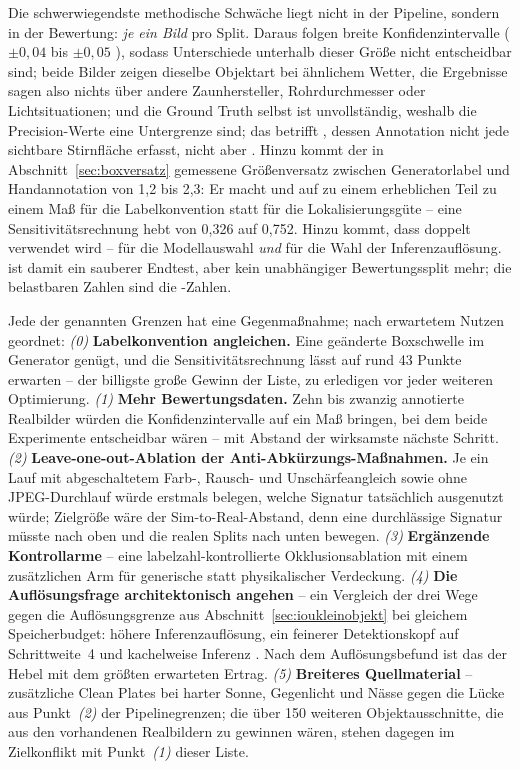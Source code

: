 Die schwerwiegendste methodische Schwäche liegt
nicht in der Pipeline, sondern in der Bewertung: \emph{je ein Bild} pro Split.
Daraus folgen breite Konfidenzintervalle ($\pm 0{,}04$ bis $\pm 0{,}05$
\mAPfifty{}), sodass Unterschiede unterhalb dieser Größe nicht entscheidbar sind;
beide Bilder zeigen dieselbe Objektart bei ähnlichem Wetter, die Ergebnisse sagen
also nichts über andere Zaunhersteller, Rohrdurchmesser oder Lichtsituationen;
und die Ground Truth selbst ist unvollständig, weshalb die Precision-Werte eine
Untergrenze sind; das betrifft , dessen Annotation nicht jede
sichtbare Stirnfläche erfasst, nicht aber . Hinzu kommt der in
Abschnitt~\ref{sec:boxversatz}
gemessene Größenversatz zwischen Generatorlabel und Handannotation von 1,2 bis
2,3\px:
Er macht \mAPseven{} und \mAPall{} auf  zu einem erheblichen Teil zu
einem Maß für die Labelkonvention statt für die Lokalisierungsgüte -- eine
Sensitivitätsrechnung hebt \mAPseven{} von 0,326 auf 0,752. Hinzu kommt, dass  doppelt verwendet wird -- für die
Modellauswahl \emph{und} für die Wahl der Inferenzauflösung.  ist
damit ein sauberer Endtest,  aber kein unabhängiger Bewertungssplit
mehr; die belastbaren Zahlen sind die -Zahlen.

 Jede der genannten Grenzen hat eine Gegenmaßnahme;
nach erwartetem Nutzen geordnet: \emph{(0)} \textbf{Labelkonvention angleichen.}
Eine geänderte Boxschwelle im Generator genügt, und die Sensitivitätsrechnung
lässt auf  rund 43 Punkte \mAPseven{} erwarten -- der billigste große
Gewinn der Liste, zu erledigen vor jeder weiteren Optimierung.
\emph{(1)} \textbf{Mehr Bewertungsdaten.} Zehn
bis zwanzig annotierte Realbilder würden die Konfidenzintervalle auf ein Maß
bringen, bei dem beide Experimente entscheidbar wären -- mit Abstand der
wirksamste nächste Schritt. \emph{(2)}
\textbf{Leave-one-out-Ablation der Anti-Abkürzungs-Maßnahmen.} Je ein Lauf mit
abgeschaltetem Farb-, Rausch- und Unschärfeangleich sowie ohne JPEG-Durchlauf
würde erstmals belegen, welche Signatur tatsächlich ausgenutzt würde; Zielgröße
wäre der Sim-to-Real-Abstand, denn eine durchlässige Signatur müsste 
nach oben und die realen Splits nach unten bewegen. \emph{(3)} \textbf{Ergänzende
Kontrollarme} -- eine labelzahl-kontrollierte Okklusionsablation mit einem
zusätzlichen Arm für generische statt physikalischer Verdeckung. \emph{(4)}
\textbf{Die Auflösungsfrage architektonisch angehen} -- ein Vergleich der drei
Wege gegen die Auflösungsgrenze aus Abschnitt~\ref{sec:ioukleinobjekt} bei
gleichem Speicherbudget: höhere Inferenzauflösung, ein feinerer Detektionskopf
auf Schrittweite~4 und kachelweise Inferenz \parencite{akyon2022sahi}. Nach dem
Auflösungsbefund ist das der Hebel mit dem größten erwarteten Ertrag. \emph{(5)} \textbf{Breiteres Quellmaterial} -- zusätzliche
Clean Plates bei harter Sonne, Gegenlicht und Nässe gegen die Lücke aus
Punkt~\emph{(2)} der Pipelinegrenzen; die über 150 weiteren Objektausschnitte,
die aus den vorhandenen Realbildern zu gewinnen wären, stehen dagegen im
Zielkonflikt mit Punkt~\emph{(1)} dieser Liste.

